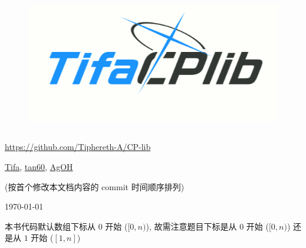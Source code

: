\documentclass[10pt]{ICPCnotebook}
\begin{document}
\begin{titlepage}
    \vspace*{3cm}
    \begin{figure}[H]
        \centering
        \includegraphics[height=6cm]{img/cplib-logo-ba-style.png}
    \end{figure}

    \vspace*{6cm}
    \begin{center}
        \large \url{https://github.com/Tiphereth-A/CP-lib}
    \end{center}

    \vspace*{0.3cm}
    \begin{center}
        \href{https://github.com/Tiphereth-A}{Tifa}, \href{https://github.com/hongmaoya}{tan60}, \href{https://github.com/StableAgOH}{AgOH}
    \end{center}
    \begin{center}
        (按首个修改本文档内容的 commit 时间顺序排列)
    \end{center}

    \vspace*{0.2cm}
    \begin{center}
        \today
    \end{center}
\end{titlepage}

\pagestyle{plain}


本书代码默认数组下标从 \(0\) 开始 (\([0, n)\)), 故需注意题目下标是从 \(0\) 开始 (\([0, n)\)) 还是从 \(1\) 开始 (\([1, n]\))

\inputminted{cpp}{src/main.cpp}

\inputminted{cpp}{src/test.cpp}

\inputminted{yaml}{src/.clang-format}

\inputminted{bash}{src/run.sh}
\end{document}
